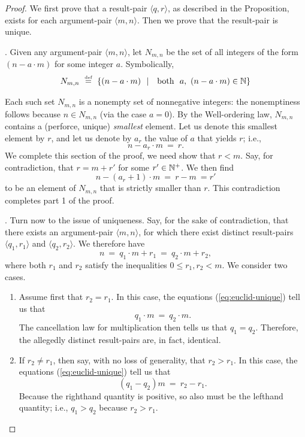 \begin{proof}
We first prove that a result-pair $\langle q, r \rangle$, as described
in the Proposition, exists for each argument-pair $\langle m, n
\rangle$.  Then we prove that the result-pair is unique.

\medskip

.
%
Given any argument-pair $\langle m, n \rangle$, let $N_{m,n}$ be the
set of all integers of the form $(n - a \cdot m)$ for some
integer $a$.  Symbolically,
\[ N_{m,n} \ \stackrel{\mbox{{\tiny def}}}{=} \ \{ (n - a \cdot m) \ \ | \ \  \mbox{ both } \  a,  \
(n - a \cdot m) \in \mathbb{N}  \}
\]

Each such set $N_{m,n}$ is a nonempty set of nonnegative integers: the
nonemptiness follows because $n \in N_{m,n}$ (via the case $a=0$).  By
the Well-ordering law, $N_{m,n}$ contains a (perforce, unique) {\em
  smallest} element.  Let us denote this smallest element by $r$, and
let us denote by $a_r$ the value of $a$ that yields $r$; i.e.,
\[ n - a_r \cdot m \ = \ r.  \]
We complete this section of the proof, we need show that $r < m$.
Say, for contradiction, that $r = m+r'$ for some $r' \in \mathbb{N}^+$.  We
then find
\[ n - (a_r +1)  \cdot m \ = \ r -m \ = r' \]
to be an element of $N_{m,n}$ that is strictly smaller than $r$.  This
contradiction completes part 1 of the proof.

\medskip

.
%
Turn now to the issue of uniqueness.  Say, for the sake of
contradiction, that there exists an argument-pair $\langle m, n
\rangle$, for which there exist distinct result-pairs $\langle q_1,
r_1 \rangle$ and $\langle q_2, r_2 \rangle$.  We therefore have
\begin{equation}
\label{eq:euclid-unique}
n \ = \ q_1 \cdot m + r_1 \ = \ q_2 \cdot m + r_2,
\end{equation}
where both $r_1$ and $r_2$ satisfy the inequalities $0 \leq r_1, r_2
<m$.  We consider two cases.
\begin{enumerate}
\item
Assume first that $r_2 = r_1$.  In this case, the equations
(\ref{eq:euclid-unique}) tell us that
\[ q_1 \cdot m \ = \ q_2 \cdot m. \]
The cancellation law for multiplication then tells us that $q_1 =
q_2$.  Therefore, the allegedly distinct result-pairs are, in fact,
identical.

\item
If $r_2 \neq r_1$, then say, with no loss of generality, that $r_2 >
r_1$.  In this case, the equations (\ref{eq:euclid-unique}) tell us
that
\[ (q_1 - q_2) m \ = \ r_2 - r_1 . \]
Because the righthand quantity is positive, so also must be the
lefthand quantity; i.e., $q_1 > q_2$ because $r_2 > r_1$.


\end{enumerate}
\end{proof}
